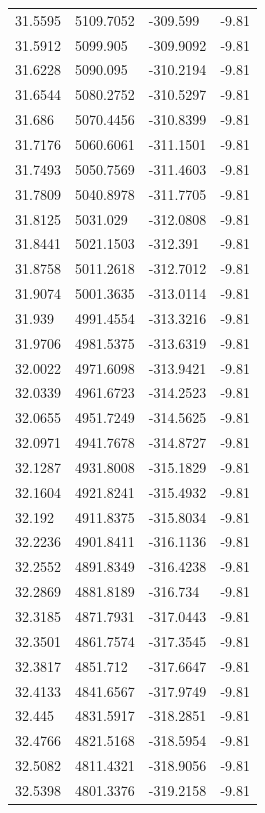 \begin{table}[H]
\begin{tabular}{llll}
31.5595 & 5109.7052 & -309.599 & -9.81 \\
31.5912 & 5099.905 & -309.9092 & -9.81 \\
31.6228 & 5090.095 & -310.2194 & -9.81 \\
31.6544 & 5080.2752 & -310.5297 & -9.81 \\
31.686 & 5070.4456 & -310.8399 & -9.81 \\
31.7176 & 5060.6061 & -311.1501 & -9.81 \\
31.7493 & 5050.7569 & -311.4603 & -9.81 \\
31.7809 & 5040.8978 & -311.7705 & -9.81 \\
31.8125 & 5031.029 & -312.0808 & -9.81 \\
31.8441 & 5021.1503 & -312.391 & -9.81 \\
31.8758 & 5011.2618 & -312.7012 & -9.81 \\
31.9074 & 5001.3635 & -313.0114 & -9.81 \\
31.939 & 4991.4554 & -313.3216 & -9.81 \\
31.9706 & 4981.5375 & -313.6319 & -9.81 \\
32.0022 & 4971.6098 & -313.9421 & -9.81 \\
32.0339 & 4961.6723 & -314.2523 & -9.81 \\
32.0655 & 4951.7249 & -314.5625 & -9.81 \\
32.0971 & 4941.7678 & -314.8727 & -9.81 \\
32.1287 & 4931.8008 & -315.1829 & -9.81 \\
32.1604 & 4921.8241 & -315.4932 & -9.81 \\
32.192 & 4911.8375 & -315.8034 & -9.81 \\
32.2236 & 4901.8411 & -316.1136 & -9.81 \\
32.2552 & 4891.8349 & -316.4238 & -9.81 \\
32.2869 & 4881.8189 & -316.734 & -9.81 \\
32.3185 & 4871.7931 & -317.0443 & -9.81 \\
32.3501 & 4861.7574 & -317.3545 & -9.81 \\
32.3817 & 4851.712 & -317.6647 & -9.81 \\
32.4133 & 4841.6567 & -317.9749 & -9.81 \\
32.445 & 4831.5917 & -318.2851 & -9.81 \\
32.4766 & 4821.5168 & -318.5954 & -9.81 \\
32.5082 & 4811.4321 & -318.9056 & -9.81 \\
32.5398 & 4801.3376 & -319.2158 & -9.81 \\

\end{tabular}
\end{table}
